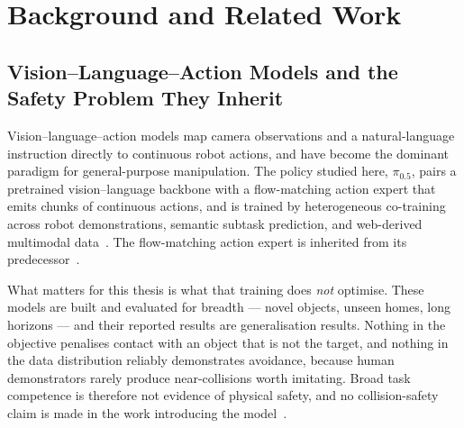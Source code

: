 %
%

\chapter{Background and Related Work}\label{ch:background}

\section{Vision--Language--Action Models and the Safety Problem They Inherit}
\label{sec:bg:vla}

Vision--language--action models map camera observations and a natural-language instruction
directly to continuous robot actions, and have become the dominant paradigm for general-purpose
manipulation. The policy studied here, $\pi_{0.5}$, pairs a pretrained vision--language backbone
with a flow-matching action expert that emits chunks of continuous actions, and is trained by
heterogeneous co-training across robot demonstrations, semantic subtask prediction, and
web-derived multimodal data~\cite{physicalintelligence2025pi05}. The flow-matching action expert
is inherited from its predecessor~\cite{black2024pi0}.

What matters for this thesis is what that training does \emph{not} optimise. These models are
built and evaluated for breadth --- novel objects, unseen homes, long horizons --- and their
reported results are generalisation results. Nothing in the objective penalises contact with an
object that is not the target, and nothing in the data distribution reliably demonstrates
avoidance, because human demonstrators rarely produce near-collisions worth imitating. Broad task
competence is therefore not evidence of physical safety, and no collision-safety claim is made in
the work introducing the model~\cite{physicalintelligence2025pi05}.

